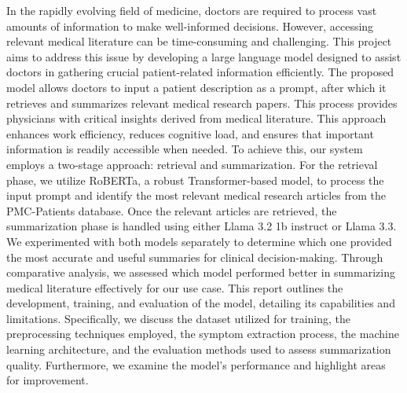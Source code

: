 In the rapidly evolving field of medicine, doctors are required to process vast amounts of information to make well-informed decisions. However, accessing relevant medical literature can be time-consuming and challenging. This project aims to address this issue by developing a large language model designed to assist doctors in gathering crucial patient-related information efficiently.
The proposed model allows doctors to input a patient description as a prompt, after which it retrieves and summarizes relevant medical research papers. This process provides physicians with critical insights derived from medical literature. This approach enhances work efficiency, reduces cognitive load, and ensures that important information is readily accessible when needed.
To achieve this, our system employs a two-stage approach: retrieval and summarization. For the retrieval phase, we utilize RoBERTa, a robust Transformer-based model, to process the input prompt and identify the most relevant medical research articles from the PMC-Patients database. 
Once the relevant articles are retrieved, the summarization phase is handled using either Llama 3.2 1b instruct or Llama 3.3. We experimented with both models separately to determine which one provided the most accurate and useful summaries for clinical decision-making. Through comparative analysis, we assessed which model performed better in summarizing medical literature effectively for our use case.
This report outlines the development, training, and evaluation of the model, detailing its capabilities and limitations. Specifically, we discuss the dataset utilized for training, the preprocessing techniques employed, the symptom extraction process, the machine learning architecture, and the evaluation methods used to assess summarization quality. Furthermore, we examine the model’s performance and highlight areas for improvement.
